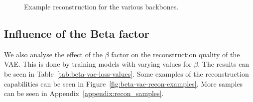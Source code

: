 \begin{figure}[!ht]
    \centering
    \caption{Example reconstruction for the various backbones.}
    \label{fig:vae-backbones}
     \quad
\end{figure}




\subsection{Influence of the Beta factor}
We also analyse the effect of the $\beta$ factor on the reconstruction quality of the VAE. This is done by training models with varying values for $\beta$. The results can be seen in Table~\ref{tab:beta-vae-loss-values}. Some examples of the reconstruction capabilities can be seen in Figure~\ref{fig:beta-vae-recon-examples}. More samples can be seen in Appendix~\ref{appendix:recon_samples}.

